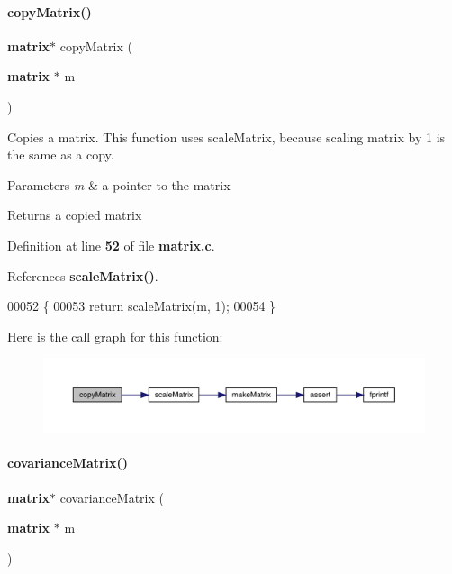 \paragraph{copy\+Matrix()}
{\footnotesize\ttfamily \textbf{ matrix}$\ast$ copy\+Matrix (\begin{DoxyParamCaption}\item[{\textbf{ matrix} $\ast$}]{m }\end{DoxyParamCaption})}



Copies a matrix. This function uses scale\+Matrix, because scaling matrix by 1 is the same as a copy. 


\begin{DoxyParams}{Parameters}
{\em m} & a pointer to the matrix \\
\hline
\end{DoxyParams}
\begin{DoxyReturn}{Returns}
a copied matrix 
\end{DoxyReturn}


Definition at line \textbf{ 52} of file \textbf{ matrix.\+c}.



References \textbf{ scale\+Matrix()}.


\begin{DoxyCode}
00052                               \{
00053     \textcolor{keywordflow}{return} scaleMatrix(m, 1);
00054 \}
\end{DoxyCode}
Here is the call graph for this function\+:\nopagebreak
\begin{figure}[H]
\begin{center}
\leavevmode
\includegraphics[width=350pt]{matrix_8c_abbb8d2d20c2dd53a2269d017a336668f_cgraph}
\end{center}
\end{figure}
\mbox{\label{matrix_8c_ae6dab569959c360cf165136a3b625edd}} 
\paragraph{covariance\+Matrix()}
{\footnotesize\ttfamily \textbf{ matrix}$\ast$ covariance\+Matrix (\begin{DoxyParamCaption}\item[{\textbf{ matrix} $\ast$}]{m }\end{DoxyParamCaption})}



